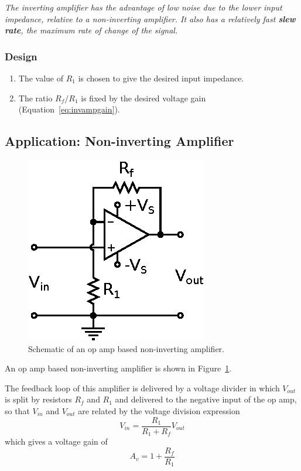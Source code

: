 \documentclass[11pt]{article}
\begin{document}
\emph{The inverting amplifier has the advantage of low noise due to
  the lower input impedance, relative to a non-inverting amplifier. It
  also has a relatively fast \textbf{slew rate}, the maximum rate of
  change of the signal.}

\subsubsection*{Design}
\begin{enumerate}
\item The value of $R_1$ is chosen to give the desired input
  impedance.

\item The ratio $R_f/R_1$ is fixed by the desired voltage gain
  (Equation~\ref{eq:invampgain}).
\end{enumerate}

\subsection{Application: Non-inverting Amplifier}
\label{sec:noninvertingamp}

\begin{figure}[ht]
  \begin{center}
    \includegraphics{noninvertingamp.eps}
    \caption{Schematic of an op amp based non-inverting amplifier.}
    \label{fig:noninvertingamp}
  \end{center}
\end{figure}

An op amp based non-inverting amplifier is shown in
Figure~\ref{fig:noninvertingamp}.

The feedback loop of this amplifier is delivered by a voltage divider
in which $V_{out}$ is split by resistors $R_f$ and $R_1$ and delivered
to the negative input of the op amp, so that $V_{in}$ and $V_{out}$
are related by the voltage division expression
\begin{equation}
  V_{in} = \frac{R_1}{R_1 + R_f} V_{out}
\end{equation}
which gives a voltage gain of
\begin{equation}
  A_v = 1 + \frac{R_f}{R_1}
  \label{eq:noninvampgain}
\end{equation}
\end{document}
